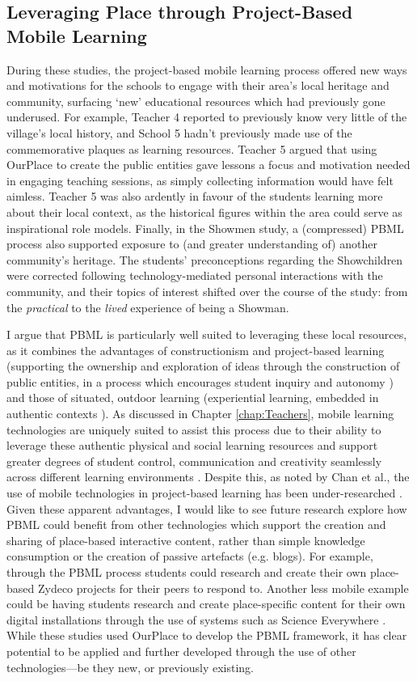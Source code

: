 \subsection{Leveraging Place through Project-Based Mobile Learning}
During these studies, the project-based mobile learning process offered new ways and motivations for the schools to engage with their area's local heritage and community, surfacing `new' educational resources which had previously gone underused. For example, Teacher 4 reported to previously know very little of the village's local history, and School 5 hadn't previously made use of the commemorative plaques as learning resources. Teacher 5 argued that using OurPlace to create the public entities gave lessons a focus and motivation needed in engaging teaching sessions, as simply collecting information would have felt aimless. Teacher 5 was also ardently in favour of the students learning more about their local context, as the historical figures within the area could serve as inspirational role models. Finally, in the Showmen study, a (compressed) PBML process also supported exposure to (and greater understanding of) another community's heritage. The students' preconceptions regarding the Showchildren were corrected following technology-mediated personal interactions with the community, and their topics of interest shifted over the course of the study: from the \textit{practical} to the \textit{lived} experience of being a Showman.

I argue that PBML is particularly well suited to leveraging these local resources, as it combines the advantages of constructionism and project-based learning (supporting the ownership and exploration of ideas through the construction of public entities, in a process which encourages student inquiry and autonomy \citep{Noss2017, Larmer2015}) and those of situated, outdoor learning (experiential learning, embedded in authentic contexts \citep{Lave1991}). As discussed in Chapter \ref{chap:Teachers}, mobile learning technologies are uniquely suited to assist this process due to their ability to leverage these authentic physical and social learning resources and support greater degrees of student control, communication and creativity seamlessly across different learning environments \citep{Sharples2007}. Despite this, as noted by Chan et al., the use of mobile technologies in project-based learning has been under-researched \citep{Chan2015}. Given these apparent advantages, I would like to see future research explore how PBML could benefit from other technologies which support the creation and sharing of place-based interactive content, rather than simple knowledge consumption or the creation of passive artefacts (e.g. blogs). For example, through the PBML process students could research and create their own place-based  Zydeco \citep{cahill2010} projects for their peers to respond to. Another less mobile example could be having students research and create place-specific content for their own digital installations through the use of systems such as Science Everywhere \citep{ahn2018}. While these studies used OurPlace to develop the PBML framework, it has clear potential to be applied and further developed through the use of other technologies---be they new, or previously existing.

